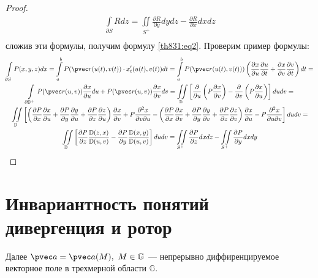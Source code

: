 \begin{proof}
\begin{gather*}
    \int\limits_{\partial S} Rdz = \iint\limits_{S^+} \frac{\partial
    R}{\partial y} dy dz - \frac{\partial R}{\partial x} dx dz \\
  \end{gather*}
  сложив эти формулы, получим формулу \eqref{th831:eq2}. Проверим пример
  формулы:
  \begin{gather*}
    \int\limits_{\partial S} P(x, y, z) dx = \int\limits_a^b P(\pvec r(u(t),
    v(t)) \cdot x_t' (u(t), v(t)) dt = \int\limits_a^b P(\pvec r(u(t), v(t)))
    \left(\frac{\partial x}{\partial u} \frac{\partial u}{\partial t} +
    \frac{\partial x}{\partial v} \frac{\partial v}{\partial t}\right) dt = \\
    \int\limits_{\partial \mathbb{D}^+} P(\pvec r(u, v)) \frac{\partial
    x}{\partial u} du + P(\pvec r(u, v)) \frac{\partial x}{\partial v} dv =
    \iint\limits_{\mathbb{D}} \left[ \frac{\partial }{\partial u}\left(P
      \frac{\partial x}{\partial v} \right) - \frac{\partial }{\partial
      v}\left(P \frac{\partial x}{\partial u} \right) \right] du dv =\\
      \iint\limits_{\mathbb{D}} \left[\left(\frac{\partial P}{\partial x}
        \frac{\partial x}{\partial u} + \frac{\partial P}{\partial y}
        \frac{\partial y}{\partial u} + \frac{\partial P}{\partial z}
        \frac{\partial z}{\partial u}\right) \frac{\partial x}{\partial v} +
        P \frac{\partial^2 x}{\partial v \partial u} - \left(\frac{\partial
        P}{\partial x} \frac{\partial x}{\partial v} + \frac{\partial
        P}{\partial y} \frac{\partial y}{\partial v} + \frac{\partial
        P}{\partial z} \frac{\partial z}{\partial v} \right) \frac{\partial
        x}{\partial u} - P\frac{\partial^2 x}{\partial u \partial v}\right] du
        dv = \\
        \iint\limits_{\mathbb{D}} \left[\frac{\partial P}{\partial z}
        \frac{\mathbb{D}(z, x)}{\mathbb{D}(u, v)} - \frac{\partial
        P}{\partial y}\frac{\mathbb{D}(x, y)}{\mathbb{D}(u, v)}\right] du dv =
        \iint\limits_{S^+} \frac{\partial P}{\partial z} dx dz -
        \iint\limits_{S^+} \frac{\partial P}{\partial y} dx dy
  \end{gather*}
\end{proof}

\section{Инвариантность понятий дивергенция и ротор}
Далее $\pvec a = \pvec a(M), \ M \in \mathbb{G}$ --- непрерывно
диффиренцируемое векторное поле в трехмерной области $\mathbb{G}$.

